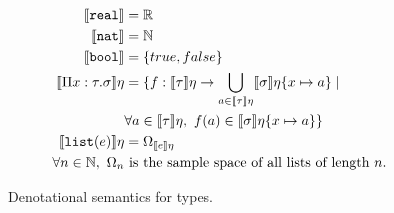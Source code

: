 \begin{figure}
 \begin{align*}
\llbracket \texttt{real} \rrbracket &= \mathbb{R} \\
\llbracket \texttt{nat} \rrbracket &= \mathbb{N}\\
 \llbracket \texttt{bool} \rrbracket &= {\{true, false\}}\\
 \llbracket \Pi x:\tau.\sigma \rrbracket\eta &= \{f: \llbracket \tau \rrbracket\eta \rightarrow 
 \bigcup_{a \in \llbracket \tau \rrbracket\eta} \llbracket \sigma \rrbracket\eta\{x \mapsto a\}
 \mid  \\
 &\forall a \in \llbracket \tau \rrbracket\eta, \ f(a) \in \llbracket \sigma\rrbracket\eta\{x\mapsto a\}\} \\
 \llbracket \texttt{list}(e) \rrbracket\eta &= \Omega_{\llbracket e \rrbracket\eta} \\
 \forall n \in \mathbb{N}, \ \Omega_n &\text{ is the sample space of all lists of length } n. 
 \end{align*}
 \caption{Denotational semantics for types.}
 \end{figure}
